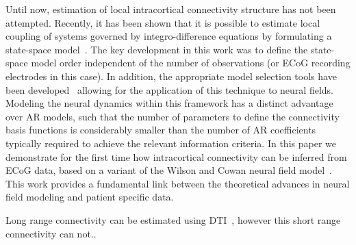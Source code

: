 \documentclass[onecolumn,draftcls]{IEEEtran}
\begin{document}
Until now, estimation of local intracortical connectivity structure has not been attempted. Recently, it has been shown that it is possible to estimate local coupling of systems governed by integro-difference equations by formulating a state-space model~\cite{Dewar2009}. The key development in this work was to define the state-space model order independent of the number of observations (or ECoG recording electrodes in this case). In addition, the appropriate model selection tools have been developed~\cite{Scerri2009} allowing for the application of this technique to neural fields. Modeling the neural dynamics within this framework has a distinct advantage over AR models, such that the number of parameters to define the connectivity basis functions is considerably smaller than the number of AR coefficients typically required to achieve the relevant information criteria. In this paper we demonstrate for the first time how intracortical connectivity can be inferred from ECoG data, based on a variant of the  Wilson and Cowan neural field model~\cite{Wilson1973}. This work provides a fundamental link between the theoretical advances in neural field modeling and patient specific data.

Long range connectivity can be estimated using DTI~\cite{Knock2009}, however this short range connectivity can not..
\end{document}
